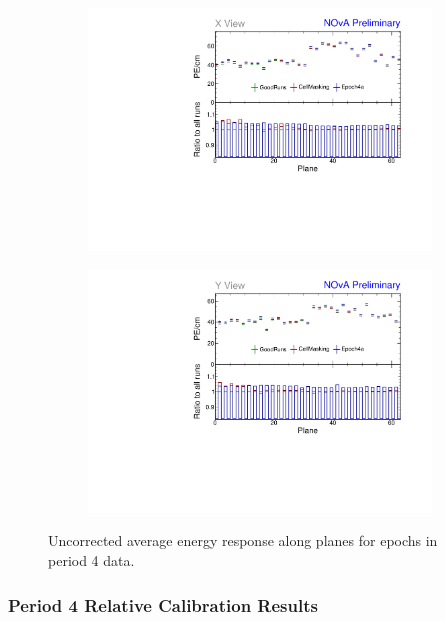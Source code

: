 \begin{figure}[!hbtp]
\centering
\begin{subfigure}[b]{0.495\textwidth}
\centering
\includegraphics[width=\textwidth]{Plots/TBCalibration/Attenprofs_P4Data_PlanePE_X_Combined.pdf}
\end{subfigure}
\begin{subfigure}[b]{0.495\textwidth}
\centering
\includegraphics[width=\textwidth]{Plots/TBCalibration/Attenprofs_P4Data_PlanePE_Y_Combined.pdf}
\end{subfigure}
\caption{Uncorrected average energy response along planes for epochs in period 4 data.}
\label{fig:CalibhistPlanePE_period4}
\end{figure}

\subsubsection*{Period 4 Relative Calibration Results}

